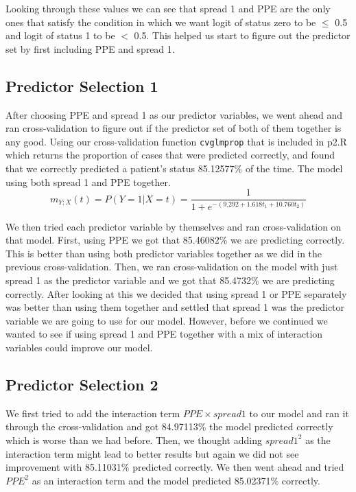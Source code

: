 \documentclass{article}
\begin{document}
Looking through these values we can see that spread 1 and PPE are the only
ones that satisfy the condition in which we want logit of status zero to
be $\leq$ 0.5 and logit of status 1 to be $<$ 0.5. This helped us start to
figure out the predictor set by first including PPE and spread 1.

\subsection{Predictor Selection 1}

After choosing PPE and spread 1 as our predictor variables, we went ahead and
ran cross-validation to figure out if the predictor set of both of them
together is any good. Using our cross-validation function \verb+cvglmprop+
that is included in p2.R which returns the proportion of cases that were
predicted correctly, and found that we correctly predicted a patient's
status 85.12577\% of the time. The model using both spread 1 and PPE together.\\

\begin{equation}
\label{logit2}
m_{Y;X}(t) = P(Y = 1 | X = t) = \frac{1}{1+e^{-(9.292+1.618
t_1 + 10.760t_2)}}
\end{equation}

We then tried each predictor variable by themselves and ran cross-validation
on that model. First, using PPE we got that 85.46082\% we are predicting
correctly. This is better than using both predictor variables together as
we did in the previous cross-validation. Then, we ran cross-validation on
the model with just spread 1 as the predictor variable and we got that 85.4732\%
we are predicting correctly. After looking at this we decided that using
spread 1 or PPE separately was better than using them together and settled
that spread 1 was the predictor variable we are going to use for our model.
However, before we continued we wanted to see if using spread 1 and PPE together
with a mix of interaction variables could improve our model.

\subsection{Predictor Selection 2}

We first tried to add the interaction term $PPE \times spread 1$ to our model
and ran it through the cross-validation and got 84.97113\% the model predicted
correctly which is worse than we had before. Then, we thought adding $spread1^{2}$
as the interaction term might lead to better results but again we did not see
improvement with 85.11031\% predicted correctly. We then went ahead and
tried $PPE^{2}$ as an interaction term and the model predicted 85.02371\% correctly.\\
\end{document}
